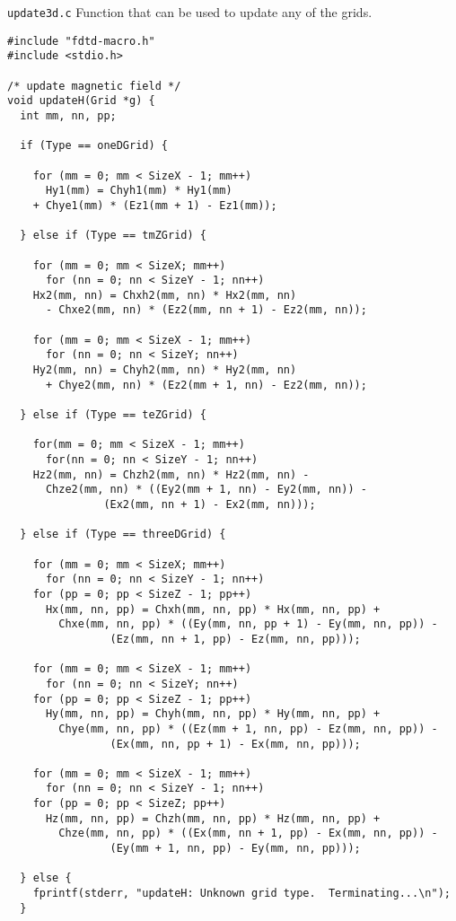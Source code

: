 \begin{program}
{\tt update3d.c} Function that can be used to update any of the grids.
\label{pro:update3d}
\codemiddle
\begin{lstlisting}
#include "fdtd-macro.h"
#include <stdio.h>

/* update magnetic field */
void updateH(Grid *g) {
  int mm, nn, pp;

  if (Type == oneDGrid) {
    
    for (mm = 0; mm < SizeX - 1; mm++)
      Hy1(mm) = Chyh1(mm) * Hy1(mm) 
	+ Chye1(mm) * (Ez1(mm + 1) - Ez1(mm));
    
  } else if (Type == tmZGrid) { 
    
    for (mm = 0; mm < SizeX; mm++)
      for (nn = 0; nn < SizeY - 1; nn++)
	Hx2(mm, nn) = Chxh2(mm, nn) * Hx2(mm, nn) 
	  - Chxe2(mm, nn) * (Ez2(mm, nn + 1) - Ez2(mm, nn));
    
    for (mm = 0; mm < SizeX - 1; mm++)
      for (nn = 0; nn < SizeY; nn++)
	Hy2(mm, nn) = Chyh2(mm, nn) * Hy2(mm, nn) 
	  + Chye2(mm, nn) * (Ez2(mm + 1, nn) - Ez2(mm, nn));
    
  } else if (Type == teZGrid) {
    
    for(mm = 0; mm < SizeX - 1; mm++)
      for(nn = 0; nn < SizeY - 1; nn++)
	Hz2(mm, nn) = Chzh2(mm, nn) * Hz2(mm, nn) -
	  Chze2(mm, nn) * ((Ey2(mm + 1, nn) - Ey2(mm, nn)) -
			   (Ex2(mm, nn + 1) - Ex2(mm, nn)));

  } else if (Type == threeDGrid) {
    
    for (mm = 0; mm < SizeX; mm++)
      for (nn = 0; nn < SizeY - 1; nn++)
	for (pp = 0; pp < SizeZ - 1; pp++)
	  Hx(mm, nn, pp) = Chxh(mm, nn, pp) * Hx(mm, nn, pp) +
	    Chxe(mm, nn, pp) * ((Ey(mm, nn, pp + 1) - Ey(mm, nn, pp)) -
				(Ez(mm, nn + 1, pp) - Ez(mm, nn, pp)));
    
    for (mm = 0; mm < SizeX - 1; mm++)
      for (nn = 0; nn < SizeY; nn++)
	for (pp = 0; pp < SizeZ - 1; pp++)
	  Hy(mm, nn, pp) = Chyh(mm, nn, pp) * Hy(mm, nn, pp) +
	    Chye(mm, nn, pp) * ((Ez(mm + 1, nn, pp) - Ez(mm, nn, pp)) -
				(Ex(mm, nn, pp + 1) - Ex(mm, nn, pp)));
    
    for (mm = 0; mm < SizeX - 1; mm++)
      for (nn = 0; nn < SizeY - 1; nn++)
	for (pp = 0; pp < SizeZ; pp++)
	  Hz(mm, nn, pp) = Chzh(mm, nn, pp) * Hz(mm, nn, pp) +
	    Chze(mm, nn, pp) * ((Ex(mm, nn + 1, pp) - Ex(mm, nn, pp)) -
				(Ey(mm + 1, nn, pp) - Ey(mm, nn, pp))); 

  } else {
    fprintf(stderr, "updateH: Unknown grid type.  Terminating...\n");
  }
  

\end{lstlisting}
\end{program}
